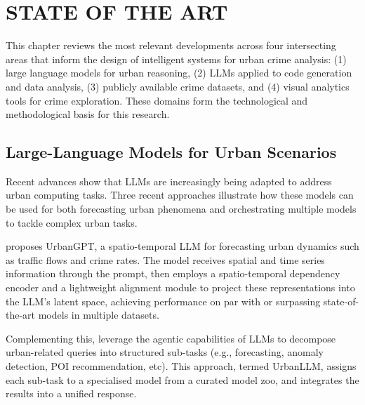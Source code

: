 \chapter{ STATE OF THE ART}

This chapter reviews the most relevant developments across four intersecting areas that inform the design of intelligent systems for urban crime analysis: (1) large language models for urban reasoning, (2) LLMs applied to code generation and data analysis, (3) publicly available crime datasets, and (4) visual analytics tools for crime exploration. These domains form the technological and methodological basis for this research.



\section{Large-Language Models for Urban Scenarios}

Recent advances show that LLMs are increasingly being adapted to address urban computing tasks. Three recent approaches illustrate how these models can be used for both forecasting urban phenomena and orchestrating multiple models to tackle complex urban tasks.

\citet{Li2024UrbanGPT} proposes UrbanGPT, a spatio-temporal LLM for forecasting urban dynamics such as traffic flows and crime rates. The model receives spatial and time series information through the prompt, then employs a spatio-temporal dependency encoder and a lightweight alignment module to project these representations into the LLM's latent space, achieving performance on par with or surpassing state-of-the-art models in multiple datasets. 

Complementing this, \cite{Jiang2024UrbanLLM} leverage the agentic capabilities of LLMs to decompose urban-related queries into structured sub-tasks (e.g., forecasting, anomaly detection, POI recommendation, etc). This approach, termed UrbanLLM, assigns each sub-task to a specialised model from a curated model zoo, and integrates the results into a unified response.


